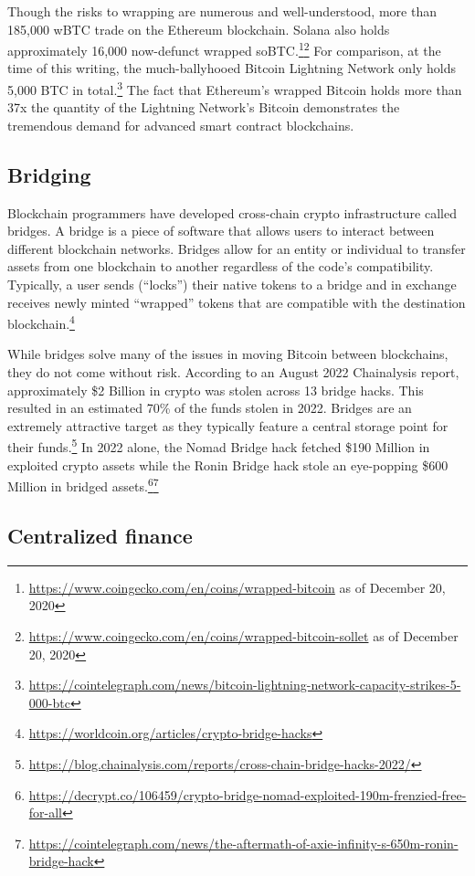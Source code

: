 \documentclass[twoside, a4paper, 11pt]{article}
\begin{document}
  Though the risks to wrapping are numerous and well-understood, more than 185,000 wBTC trade on the Ethereum blockchain. Solana also holds approximately 16,000 now-defunct wrapped soBTC.\footnote{\url{https://www.coingecko.com/en/coins/wrapped-bitcoin} as of December 20, 2020}\footnote{\url{https://www.coingecko.com/en/coins/wrapped-bitcoin-sollet} as of December 20, 2020} For comparison, at the time of this writing, the much-ballyhooed Bitcoin Lightning Network only holds 5,000 BTC in total.\footnote{\url{https://cointelegraph.com/news/bitcoin-lightning-network-capacity-strikes-5-000-btc}} The fact that Ethereum’s wrapped Bitcoin holds more than 37x the quantity of the Lightning Network’s Bitcoin demonstrates the tremendous demand for advanced smart contract blockchains.


  \subsection{Bridging}

  Blockchain programmers have developed cross-chain crypto infrastructure called bridges. A bridge is a piece of software that allows users to interact between different blockchain networks. Bridges allow for an entity or individual to transfer assets from one blockchain to another regardless of the code’s compatibility. Typically, a user sends (“locks”) their native tokens to a bridge and in exchange receives newly minted “wrapped” tokens that are compatible with the destination blockchain.\footnote{\url{https://worldcoin.org/articles/crypto-bridge-hacks}}

  While bridges solve many of the issues in moving Bitcoin between blockchains, they do not come without risk. According to an August 2022 Chainalysis report, approximately \$2 Billion in crypto was stolen across 13 bridge hacks. This resulted in an estimated 70\% of the funds stolen in 2022. Bridges are an extremely attractive target as they typically feature a central storage point for their funds.\footnote{\url{https://blog.chainalysis.com/reports/cross-chain-bridge-hacks-2022/}} In 2022 alone, the Nomad Bridge hack fetched \$190 Million in exploited crypto assets while the Ronin Bridge hack stole an eye-popping \$600 Million in bridged assets.\footnote{\url{https://decrypt.co/106459/crypto-bridge-nomad-exploited-190m-frenzied-free-for-all}}\footnote{\url{https://cointelegraph.com/news/the-aftermath-of-axie-infinity-s-650m-ronin-bridge-hack}}


  \subsection{Centralized finance}
\end{document}
